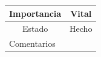 \documentclass[12pt,letterpaper]{report}
\begin{document}
\begin{table}[htp]
{\begin{tabular}{|c|c|}
				Importancia                       & Vital                                                                                                                                                                                                   \\ \hline
				Estado                            & Hecho                                                                                                                                                                                                   \\ \hline
				\multicolumn{1}{|l|}{Comentarios} & \multicolumn{1}{l|}{}                                                                                                                                                                                   \\ \hline
			\end{tabular}}
		\end{table}
\end{document}
